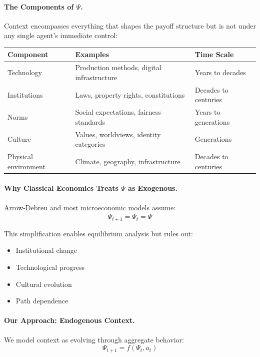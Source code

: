 \documentclass[12pt,a4paper]{article}
\begin{document}
\paragraph{The Components of $\Psi$.}
Context encompasses everything that shapes the payoff structure
but is not under any single agent's immediate control:

\begin{center}
\renewcommand{\arraystretch}{1.3}
\begin{tabular}{lll}
\hline
\textbf{Component} & \textbf{Examples} & \textbf{Time Scale} \\
\hline
Technology & Production methods, digital infrastructure & Years to decades \\
Institutions & Laws, property rights, constitutions & Decades to centuries \\
Norms & Social expectations, fairness standards & Years to generations \\
Culture & Values, worldviews, identity categories & Generations \\
Physical environment & Climate, geography, infrastructure & Decades to centuries \\
\hline
\end{tabular}
\end{center}

\paragraph{Why Classical Economics Treats $\Psi$ as Exogenous.}
Arrow-Debreu and most microeconomic models assume:
\begin{equation}
  \Psi_{t+1} = \Psi_t = \bar{\Psi}
\end{equation}

This simplification enables equilibrium analysis but rules out:
\begin{itemize}
  \item Institutional change
  \item Technological progress
  \item Cultural evolution
  \item Path dependence
\end{itemize}

\paragraph{Our Approach: Endogenous Context.}
We model context as evolving through aggregate behavior:
\begin{equation}
  \Psi_{t+1} = f(\Psi_t, a_t)
\end{equation}
\end{document}
